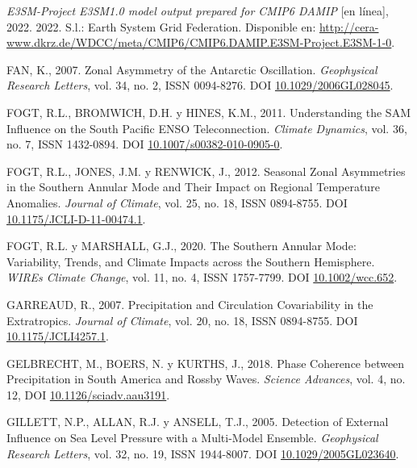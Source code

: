 \documentclass[12pt,oneside,a4paper]{reedthesis}
\newlength{\cslhangindent}
\newenvironment{CSLReferences}[2] %
 {%
  \setlength{\parindent}{0pt}
  \ifodd #1 \everypar{\setlength{\hangindent}{\cslhangindent}}\ignorespaces\fi
  \ifnum #2 > 0
  \setlength{\parskip}{#2\baselineskip}
  \fi
 }%
 {}
\begin{document}
\begin{CSLReferences}{1}{0}
\leavevmode{}%
\emph{E3SM-Project E3SM1.0 model output prepared for CMIP6 DAMIP} {[}en línea{]}, 2022. 2022. S.l.: Earth System Grid Federation. Disponible en: \url{http://cera-www.dkrz.de/WDCC/meta/CMIP6/CMIP6.DAMIP.E3SM-Project.E3SM-1-0}.

\leavevmode{}%
FAN, K., 2007. Zonal Asymmetry of the {Antarctic Oscillation}. \emph{Geophysical Research Letters}, vol. 34, no. 2, ISSN 0094-8276. DOI \href{https://doi.org/10.1029/2006GL028045}{10.1029/2006GL028045}.

\leavevmode{}%
FOGT, R.L., BROMWICH, D.H. y HINES, K.M., 2011. Understanding the {SAM} Influence on the {South Pacific ENSO} Teleconnection. \emph{Climate Dynamics}, vol. 36, no. 7, ISSN 1432-0894. DOI \href{https://doi.org/10.1007/s00382-010-0905-0}{10.1007/s00382-010-0905-0}.

\leavevmode{}%
FOGT, R.L., JONES, J.M. y RENWICK, J., 2012. Seasonal {Zonal Asymmetries} in the {Southern Annular Mode} and {Their Impact} on {Regional Temperature Anomalies}. \emph{Journal of Climate}, vol. 25, no. 18, ISSN 0894-8755. DOI \href{https://doi.org/10.1175/JCLI-D-11-00474.1}{10.1175/JCLI-D-11-00474.1}.

\leavevmode{}%
FOGT, R.L. y MARSHALL, G.J., 2020. The {Southern Annular Mode}: {Variability}, Trends, and Climate Impacts across the {Southern Hemisphere}. \emph{WIREs Climate Change}, vol. 11, no. 4, ISSN 1757-7799. DOI \href{https://doi.org/10.1002/wcc.652}{10.1002/wcc.652}.

\leavevmode{}%
GARREAUD, R., 2007. Precipitation and {Circulation Covariability} in the {Extratropics}. \emph{Journal of Climate}, vol. 20, no. 18, ISSN 0894-8755. DOI \href{https://doi.org/10.1175/JCLI4257.1}{10.1175/JCLI4257.1}.

\leavevmode{}%
GELBRECHT, M., BOERS, N. y KURTHS, J., 2018. Phase Coherence between Precipitation in {South America} and {Rossby} Waves. \emph{Science Advances}, vol. 4, no. 12, DOI \href{https://doi.org/10.1126/sciadv.aau3191}{10.1126/sciadv.aau3191}.

\leavevmode{}%
GILLETT, N.P., ALLAN, R.J. y ANSELL, T.J., 2005. Detection of External Influence on Sea Level Pressure with a Multi-Model Ensemble. \emph{Geophysical Research Letters}, vol. 32, no. 19, ISSN 1944-8007. DOI \href{https://doi.org/10.1029/2005GL023640}{10.1029/2005GL023640}.


\end{CSLReferences}
\end{document}
